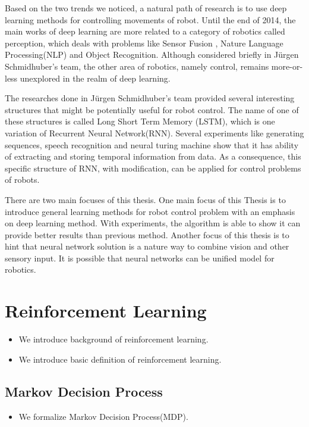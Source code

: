 \documentclass[officiallayout]{tktla}
\begin{document}
Based on the two trends we noticed, a natural path of research is to use deep learning methods for controlling movements of robot. Until the end of 2014,  the main works of deep learning are more related to a category of robotics called perception, which deals with problems like Sensor Fusion \cite{OConnor2013}, Nature Language Processing(NLP)\cite{Cho2014} and Object Recognition\cite{Lenz2013}\cite{Hoffman2014}. Although considered briefly in J{\"u}rgen Schmidhuber's team\cite{Mayer2006}, the other area of robotics, namely control, remains more-or-less unexplored in the realm of deep learning.

The researches done in J{\"u}rgen Schmidhuber's team provided several interesting structures that might be potentially useful for robot control. The name of one of these structures is called Long Short Term Memory (LSTM), which is one variation of Recurrent Neural Network(RNN). Several experiments like generating sequences\cite{Graves2013}, speech recognition\cite{Graves2013b} and neural turing machine \cite{Graves2014} show that it has ability of extracting and storing temporal information from data. As a consequence, this specific structure of RNN, with modification, can be applied for control problems of robots.

There are two main focuses of this thesis. One main focus of this Thesis is to introduce general learning methods for robot control problem with an emphasis on deep learning method. With experiments, the algorithm is able to show it can provide better results than previous method. Another focus of this thesis is to hint that neural network solution is a nature way to combine vision and other sensory input. It is possible that neural networks can be unified model for robotics.

\chapter{Reinforcement Learning}
\begin{itemize}
\item We introduce background of reinforcement learning.
\item We introduce basic definition of reinforcement learning.
\end{itemize}

\section{Markov Decision Process}
\begin{itemize}
\item We formalize Markov Decision Process(MDP).
\end{itemize}
\end{document}
